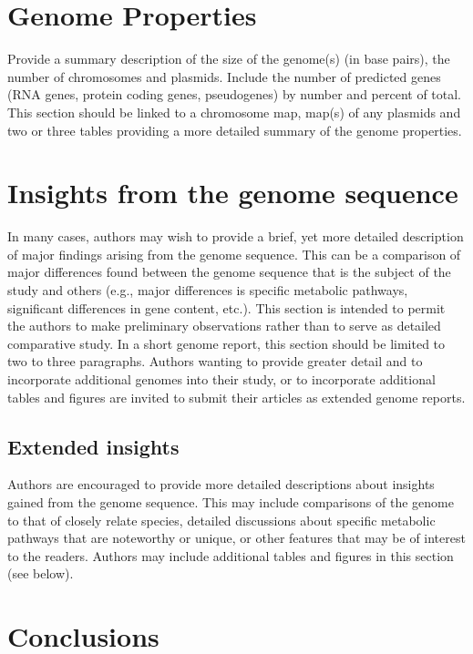 \documentclass{bmcart}
\begin{document}
{%
\section*{Genome Properties}
Provide a summary description of the size of the genome(s) (in base pairs), the number of chromosomes and plasmids. Include the number of predicted genes (RNA genes, protein coding genes, pseudogenes) by number and percent of total. This section should be linked to a chromosome map, map(s) of any plasmids and two or three tables providing a more detailed summary of the genome properties.

\section*{Insights from the genome sequence}
In many cases, authors may wish to provide a brief, yet more detailed description of major findings arising from the genome sequence. This can be a comparison of major differences found between the genome sequence that is the subject of the study and others (e.g., major differences is specific metabolic pathways, significant differences in gene content, etc.). This section is intended to permit the authors to make preliminary observations rather than to serve as detailed comparative study. In a short genome report, this section should be limited to two to three paragraphs. Authors wanting to provide greater detail and to incorporate additional genomes into their study, or to incorporate additional tables and figures are invited to submit their articles as extended genome reports.

\subsection*{Extended insights}
Authors are encouraged to provide more detailed descriptions about insights gained from the genome sequence. This may include comparisons of the genome to that of closely relate species, detailed discussions about specific metabolic pathways that are noteworthy or unique, or other features that may be of interest to the readers. Authors may include additional tables and figures in this section (see below).

\section*{Conclusions}

}
\end{document}
